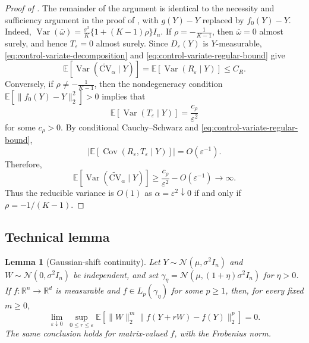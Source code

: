 \documentclass[12pt]{article}
\newtheorem{lemma}{Lemma}[section]
\def\E{\mathbb{E}}
\def\calN{\mathcal{N}}
\theoremstyle{general}
\newcommand{\cv}{{\mathrm{CV}}}
\begin{document}
\begin{proof}[Proof of ]
The remainder of the argument is identical to the necessity and
sufficiency argument in the proof of , with
\(g(Y)-Y\) replaced by \(f_0(Y)-Y\). Indeed,
$\operatorname{Var}(\overline\omega)= \frac{\sigma^2}{K}
\{1+(K-1)\rho\}I_n$.
If $\rho=-\frac{1}{K-1}$,
then \(\overline\omega=0\) almost surely, and hence
\(T_\varepsilon=0\) almost surely. Since \(D_\varepsilon(Y)\) is
\(Y\)-measurable, \eqref{eq:control-variate-decomposition} and
\eqref{eq:control-variate-regular-bound} give
\[
\mathbb E\!\left[
\operatorname{Var}
\left(
\widetilde{\cv}_{\alpha}\mid Y
\right)
\right]
=
\mathbb E\!\left[
\operatorname{Var}(R_\varepsilon\mid Y)
\right]
\leq C_R.
\]
Conversely, if $\rho\neq-\frac{1}{K-1}$,
then the nondegeneracy condition $\E[\|f_0(Y) - Y\|_2^2 ]>0$ implies that
\[
\mathbb E\!\left[
\operatorname{Var}(T_\varepsilon\mid Y)
\right]
=
\frac{c_\rho}{\varepsilon^2}
\]
for some \(c_\rho>0\). By conditional Cauchy--Schwarz and
\eqref{eq:control-variate-regular-bound},
\[
\left|
\mathbb E\!\left[
\operatorname{Cov}
\left(
R_\varepsilon,T_\varepsilon\mid Y
\right)
\right]
\right|
=
O(\varepsilon^{-1}).
\]
Therefore,
\[
\mathbb E\!\left[
\operatorname{Var}
\left(
\widetilde{\cv}_{\alpha}\mid Y
\right)
\right]
\geq
\frac{c_\rho}{\varepsilon^2}
-
O(\varepsilon^{-1})
\longrightarrow\infty.
\]
Thus the reducible variance is \(O(1)\) as
\(\alpha=\varepsilon^2\downarrow0\) if and only if
\(\rho=-1/(K-1)\).
\end{proof}



\subsection{Technical lemma}


\begin{lemma}[Gaussian-shift continuity]
\label{lem:gaussian-shift-continuity}
Let $Y\sim\calN(\mu,\sigma^2I_n)$ and
$W\sim\calN(0,\sigma^2I_n)$ be independent, and set
$\gamma_\eta=\calN(\mu,(1+\eta)\sigma^2I_n)$ for $\eta>0$.
If $f:\mathbb R^n\to\mathbb R^d$ is measurable and
$f\in L_p(\gamma_\eta)$ for some $p\geq1$, then, for every fixed
$m\geq0$,
\[
\lim_{\varepsilon\downarrow0}\;
\sup_{0\leq r\leq\varepsilon}
\mathbb E\left[
\|W\|_2^m\|f(Y+rW)-f(Y)\|_2^p
\right]=0.
\]
The same conclusion holds for matrix-valued $f$, with the Frobenius norm.
\end{lemma}
\end{document}
